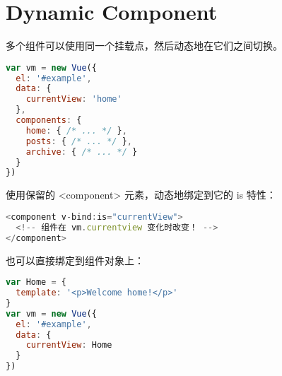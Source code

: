 \begin{lstlisting}[language=JavaScript]

\end{lstlisting}


\section{Dynamic Component}


多个组件可以使用同一个挂载点，然后动态地在它们之间切换。

\begin{lstlisting}[language=JavaScript]
var vm = new Vue({
  el: '#example',
  data: {
    currentView: 'home'
  },
  components: {
    home: { /* ... */ },
    posts: { /* ... */ },
    archive: { /* ... */ }
  }
})
\end{lstlisting}


使用保留的 <component> 元素，动态地绑定到它的 is 特性：


\begin{lstlisting}[language=JavaScript]
<component v-bind:is="currentView">
  <!-- 组件在 vm.currentview 变化时改变！ -->
</component>
\end{lstlisting}

也可以直接绑定到组件对象上：

\begin{lstlisting}[language=JavaScript]
var Home = {
  template: '<p>Welcome home!</p>'
}
var vm = new Vue({
  el: '#example',
  data: {
    currentView: Home
  }
})
\end{lstlisting}



\begin{lstlisting}[language=JavaScript]

\end{lstlisting}



\begin{lstlisting}[language=JavaScript]

\end{lstlisting}




\begin{lstlisting}[language=JavaScript]

\end{lstlisting}



\begin{lstlisting}[language=JavaScript]

\end{lstlisting}




